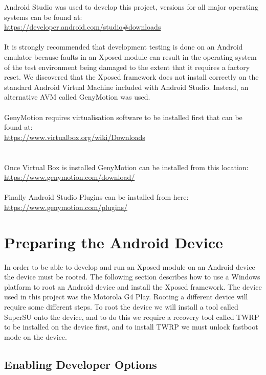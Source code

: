 Android Studio was used to develop this project, versions for all major operating systems can be found at:\\
\url{https://developer.android.com/studio#downloads}\\
\\
It is strongly recommended that development testing is done on an Android emulator because faults in an Xposed module can result in the operating system of the test environment being damaged to the extent that it requires a factory reset.  We discovered that the Xposed framework does not install correctly on the standard Android Virtual Machine included with Android Studio.  Instead, an alternative AVM called GenyMotion was used.\\
\\
GenyMotion requires virtualisation software to be installed first that can be found at:\\
\url{https://www.virtualbox.org/wiki/Downloads}\\
\\
\\
Once Virtual Box is installed GenyMotion can be installed from this location:\\
\url{https://www.genymotion.com/download/}\\
\\
Finally Android Studio Plugins can be installed from here:\\
\url{https://www.genymotion.com/plugins/}

\section{Preparing the Android Device}
\label{sec:Preparing the Android device}

In order to be able to develop and run an Xposed module on an Android device the device must be rooted.  The following section describes how to use a Windows platform to root an Android device and install the Xposed framework.  The device used in this project was the Motorola G4 Play.  Rooting a different device will require some different steps.  To root the device we will install a tool called SuperSU onto the device, and to do this we require a recovery tool called TWRP to be installed on the device first, and to install TWRP we must unlock fastboot mode on the device.

\subsection{Enabling Developer Options}
\label{sec:Enabling developer options on the device}


